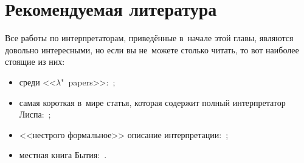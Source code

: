 \section*{Рекомендуемая литература}

Все работы по интерпретаторам, приведённые в~начале этой главы, являются
довольно интересными, но если вы не~можете столько читать, то вот наиболее
стоящие из них:
\begin{itemize}
  \item среди <<$\lambda$"~papers>>:~\cite{ss78a};

  \item самая короткая в~мире статья, которая содержит полный интерпретатор
        Лиспа:~\cite{mcc78b};

  \item <<нестрого формальное>> описание интерпретации:~\cite{rey72};

  \item местная книга Бытия:~\cite{mae+62}.
\end{itemize}
